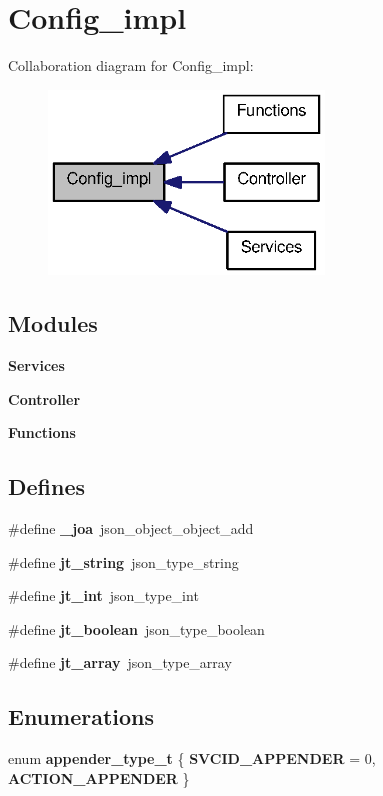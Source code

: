 \section{Config\_\-impl}
\label{group__config__impl}
Collaboration diagram for Config\_\-impl:\nopagebreak
\begin{figure}[H]
\begin{center}
\leavevmode
\includegraphics[width=208pt]{group__config__impl}
\end{center}
\end{figure}
\subsection*{Modules}
\begin{DoxyCompactItemize}
\item 
{\bf Services}
\item 
{\bf Controller}
\item 
{\bf Functions}
\end{DoxyCompactItemize}
\subsection*{Defines}
\begin{DoxyCompactItemize}
\item 
\#define {\bf \_\-joa}~json\_\-object\_\-object\_\-add
\item 
\#define {\bf jt\_\-string}~json\_\-type\_\-string
\item 
\#define {\bf jt\_\-int}~json\_\-type\_\-int
\item 
\#define {\bf jt\_\-boolean}~json\_\-type\_\-boolean
\item 
\#define {\bf jt\_\-array}~json\_\-type\_\-array
\end{DoxyCompactItemize}
\subsection*{Enumerations}
\begin{DoxyCompactItemize}
\item 
enum {\bf appender\_\-type\_\-t} \{ {\bf SVCID\_\-APPENDER} =  0, 
{\bf ACTION\_\-APPENDER}
 \}
\end{DoxyCompactItemize}

